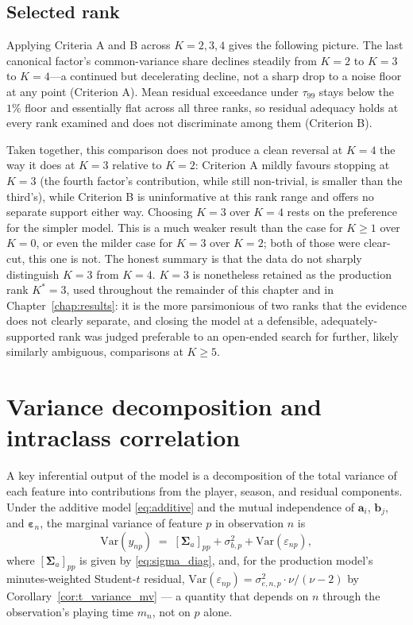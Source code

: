\subsection{Selected rank}
\label{sec:rank_selection}

Applying Criteria A and B across $K=2, 3, 4$ gives the following picture. The last canonical factor's common-variance share declines steadily from $K=2$ to $K=3$ to $K=4$---a continued but decelerating decline, not a sharp drop to a noise floor at any point (Criterion A). Mean residual exceedance under $\tau_{99}$ stays below the $1\%$ floor and essentially flat across all three ranks, so residual adequacy holds at every rank examined and does not discriminate among them (Criterion B).

Taken together, this comparison does not produce a clean reversal at $K=4$ the way it does at $K=3$ relative to $K=2$: Criterion A mildly favours stopping at $K=3$ (the fourth factor's contribution, while still non-trivial, is smaller than the third's), while Criterion B is uninformative at this rank range and offers no separate support either way. Choosing $K=3$ over $K=4$ rests on the preference for the simpler model. This is a much weaker result than the case for $K\geq 1$ over $K=0$, or even the milder case for $K=3$ over $K=2$; both of those were clear-cut, this one is not. The honest summary is that the data do not sharply distinguish $K=3$ from $K=4$. $K=3$ is nonetheless retained as the production rank $K^*=3$, used throughout the remainder of this chapter and in Chapter~\ref{chap:results}: it is the more parsimonious of two ranks that the evidence does not clearly separate, and closing the model at a defensible, adequately-supported rank was judged preferable to an open-ended search for further, likely similarly ambiguous, comparisons at $K \geq 5$.


\section{Variance decomposition and intraclass correlation}
\label{sec:icc}

A key inferential output of the model is a decomposition of the total variance of each feature into contributions from the player, season, and residual components. Under the additive model \eqref{eq:additive} and the mutual independence of $\mathbf{a}_i$, $\mathbf{b}_j$, and $\boldsymbol{\varepsilon}_n$, the marginal variance of feature $p$ in observation $n$ is
\begin{equation}
\mathrm{Var}(y_{np}) \;=\; [\boldsymbol{\Sigma}_a]_{pp} + \sigma_{b,p}^2 + \mathrm{Var}(\varepsilon_{np}),
\label{eq:total_variance}
\end{equation}
where $[\boldsymbol{\Sigma}_a]_{pp}$ is given by \eqref{eq:sigma_diag}, and, for the production model's minutes-weighted Student-$t$ residual, $\mathrm{Var}(\varepsilon_{np}) = \sigma_{e,n,p}^2 \cdot \nu/(\nu-2)$ by Corollary~\ref{cor:t_variance_mv} --- a quantity that depends on $n$ through the observation's playing time $m_n$, not on $p$ alone.

